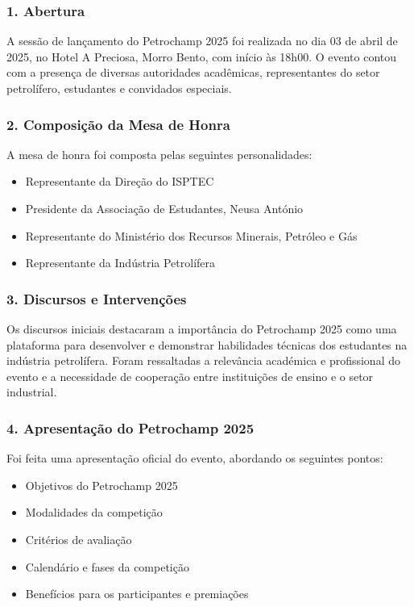 \documentclass[11pt,a4paper]{article}
\begin{document}
\subsubsection*{1. Abertura}

A sessão de lançamento do Petrochamp 2025 foi realizada no dia 03 de abril de 2025, no Hotel A Preciosa, Morro Bento, com início às 18h00. O evento contou com a presença de diversas autoridades acadêmicas, representantes do setor petrolífero, estudantes e convidados especiais.

\subsubsection*{2. Composição da Mesa de Honra}

A mesa de honra foi composta pelas seguintes personalidades:
\begin{itemize}
  \item Representante da Direção do ISPTEC
  \item Presidente da Associação de Estudantes, Neusa António
  \item Representante do Ministério dos Recursos Minerais, Petróleo e Gás
  \item Representante da Indústria Petrolífera
\end{itemize}

\subsubsection*{3. Discursos e Intervenções}

Os discursos iniciais destacaram a importância do Petrochamp 2025 como uma plataforma para desenvolver e demonstrar habilidades técnicas dos estudantes na indústria petrolífera. Foram ressaltadas a relevância académica e profissional do evento e a necessidade de cooperação entre instituições de ensino e o setor industrial.

\subsubsection*{4. Apresentação do Petrochamp 2025}

Foi feita uma apresentação oficial do evento, abordando os seguintes pontos:
\begin{itemize}
  \item Objetivos do Petrochamp 2025
  \item Modalidades da competição
  \item Critérios de avaliação
  \item Calendário e fases da competição
  \item Benefícios para os participantes e premiações
\end{itemize}
\end{document}
